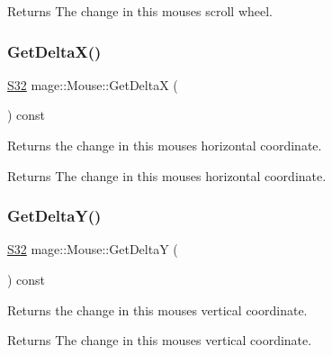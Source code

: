 \begin{DoxyReturn}{Returns}
The change in this mouse\textquotesingle{}s scroll wheel. 
\end{DoxyReturn}
\hypertarget{classmage_1_1_mouse_a1f6c7164c1705d834c2f603f22398077}{}\label{classmage_1_1_mouse_a1f6c7164c1705d834c2f603f22398077} 
\subsubsection{\texorpdfstring{Get\+Delta\+X()}{GetDeltaX()}}
{\footnotesize\ttfamily \hyperlink{namespacemage_a642e05c5c83642b6946703615cdbf2da}{S32} mage\+::\+Mouse\+::\+Get\+DeltaX (\begin{DoxyParamCaption}{ }\end{DoxyParamCaption}) const\hspace{0.3cm}{\ttfamily [noexcept]}}

Returns the change in this mouse\textquotesingle{}s horizontal coordinate.

\begin{DoxyReturn}{Returns}
The change in this mouse\textquotesingle{}s horizontal coordinate. 
\end{DoxyReturn}
\hypertarget{classmage_1_1_mouse_a95da9aa89fc63d4d96666da52e63d558}{}\label{classmage_1_1_mouse_a95da9aa89fc63d4d96666da52e63d558} 
\subsubsection{\texorpdfstring{Get\+Delta\+Y()}{GetDeltaY()}}
{\footnotesize\ttfamily \hyperlink{namespacemage_a642e05c5c83642b6946703615cdbf2da}{S32} mage\+::\+Mouse\+::\+Get\+DeltaY (\begin{DoxyParamCaption}{ }\end{DoxyParamCaption}) const\hspace{0.3cm}{\ttfamily [noexcept]}}

Returns the change in this mouse\textquotesingle{}s vertical coordinate.

\begin{DoxyReturn}{Returns}
The change in this mouse\textquotesingle{}s vertical coordinate. 
\end{DoxyReturn}
\hypertarget{classmage_1_1_mouse_a240b7fe1d68448fa922d769187f6358a}{}\label{classmage_1_1_mouse_a240b7fe1d68448fa922d769187f6358a} 
